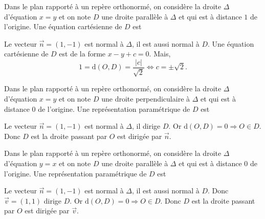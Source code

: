 \begin{question}
Dans le plan rapporté à un repère orthonormé, on considère la droite $\Delta$ d'équation $x=y$ et on note $D$ une droite parallèle à $\Delta$ et qui est à distance $1$ de l'origine. Une équation cartésienne de $D$ est
\begin{answers}  
\end{answers}
\begin{explanations}
Le vecteur $\vec{n}=(1,-1)$ est normal à $\Delta$, il est aussi normal à $D$. Une équation cartésienne de $D$ est de la forme $x-y+c=0$. Mais,
$$1=\mbox{d}(O,D)=\frac{|c|}{\sqrt{2}}\Leftrightarrow c=\pm \sqrt{2}.$$
\end{explanations}
\end{question}



\begin{question}
Dans le plan rapporté à un repère orthonormé, on considère la droite $\Delta$ d'équation $x=y$ et on note $D$ une droite perpendiculaire à $\Delta$ et qui est à distance $0$ de l'origine. Une représentation paramétrique de $D$ est
\begin{answers}  
\end{answers}
\begin{explanations}
Le vecteur $\vec{n}=(1,-1)$ est normal à $\Delta$, il dirige $D$. Or $\mbox{d}(O,D)=0\Rightarrow O\in D$. Donc $D$ est la droite passant par $O$ est dirigée par $\vec{n}$.
\end{explanations}
\end{question}


\begin{question}
Dans le plan rapporté à un repère orthonormé, on considère la droite $\Delta$ d'équation $y=x$ et on note $D$ une droite parallèle à $\Delta$ et qui est à distance $0$ de l'origine. Une représentation paramétrique de $D$ est
\begin{answers}  
\end{answers}
\begin{explanations}
Le vecteur $\vec{n}=(1,-1)$ est normal à $\Delta$, il est aussi normal à $D$. Donc $\vec{v}=(1,1)$ dirige $D$. Or $\mbox{d}(O,D)=0\Rightarrow O\in D$. Donc $D$ est la droite passant par $O$ est dirigée par $\vec{v}$.
\end{explanations}
\end{question}



